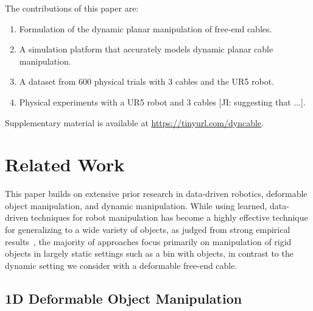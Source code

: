 \documentclass[letterpaper, 10 pt, conference]{ieeeconf}  %
\newcommand{\remark}[3]{{\color{#2}[#1: #3]}}
\newcommand{\daniel}[1]{\remark{Daniel}{blue}{#1}}
\newcommand{\Lawrence}[1]{\remark{Lawrence}{orange}{#1}}
\newcommand{\jeffi}[1]{\remark{JI}{red}{#1}}
\begin{document}
The contributions of this paper are:
\begin{enumerate}
    \item Formulation of the dynamic planar manipulation of free-end cables.
    \item A simulation platform that accurately models dynamic planar cable manipulation.
    \item A dataset from 600 physical trials with 3 cables and the UR5 robot.
    \item Physical experiments with a UR5 robot and 3 cables \jeffi{suggesting that ...}.
\end{enumerate}
Supplementary material is available at 
\url{https://tinyurl.com/dyncable}.





\section{Related Work}\label{sec:rw}

This paper builds on extensive prior research in data-driven robotics, deformable object manipulation, and dynamic manipulation. While using learned, data-driven techniques for robot manipulation has become a highly effective technique for generalizing to a wide variety of objects, as judged from strong empirical results~\cite{levine_finn_2016,mahler2019learning,dense_object_nets_2018,QT-Opt,openai-dactyl,rubik_cube_2019}, the majority of approaches focus primarily on manipulation of rigid objects in largely static settings such as a bin with objects, in contrast to the dynamic setting we consider with a deformable free-end cable.

\subsection{1D Deformable Object Manipulation}
\end{document}
